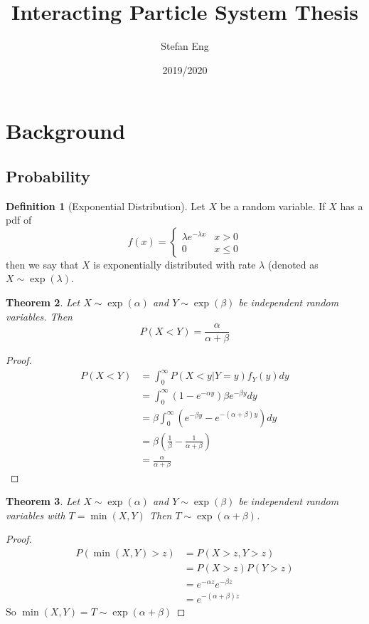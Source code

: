 \documentclass{article}
\title{Interacting Particle System Thesis}
\author{Stefan Eng}
\date{2019/2020}
\theoremstyle{plain}
\newtheorem{theorem}{Theorem}[section]
\theoremstyle{definition}
\newtheorem{defn}[theorem]{Definition}
\theoremstyle{remark}
\begin{document}
\maketitle

\section{Background}

\subsection{Probability}

\begin{defn}[Exponential Distribution]
Let $X$ be a random variable.
If $X$ has a pdf of 
$$
f(x) = \begin{cases}
    \lambda e^{-\lambda x} & x > 0\\
    0 & x \leq 0
    \end{cases}
$$
then we say that $X$ is exponentially distributed with rate $\lambda$ (denoted as $X \sim \exp(\lambda)$.
\end{defn}

\begin{theorem}\label{thm:exp_x_less_y}
Let $X \sim \exp(\alpha)$ and $Y \sim \exp(\beta)$ be independent random variables.
Then 
$$
P(X < Y) = \frac{\alpha}{\alpha + \beta}
$$
\end{theorem}

\begin{proof}
\begin{align*}
    P(X < Y) &= \int_0^\infty P(X < y | Y = y) f_Y(y) dy\\
    &= \int_0^\infty (1 - e^{-\alpha y}) \beta e^{-\beta y} dy\\
    &= \beta \int_0^\infty \left( e^{-\beta y} - e^{-(\alpha + \beta) y}\right) dy\\
    &= \beta \left(\frac{1}{\beta} - \frac{1}{\alpha + \beta}\right)\\
    &= \frac{\alpha}{\alpha + \beta}
\end{align*}
\end{proof}

\begin{theorem}\label{thm:exp_t_cond}
Let $X \sim \exp(\alpha)$ and $Y \sim \exp(\beta)$ be independent random variables with $T = \min(X,Y)$
Then $T \sim \exp(\alpha + \beta)$.
\end{theorem}

\begin{proof}
\begin{align*}
    P(\min(X,Y) > z) &= P(X > z, Y > z)\\
    &= P(X > z) P(Y > z)\\
    &= e^{-\alpha z} e^{-\beta z}\\
    &= e^{-(\alpha + \beta) z}
\end{align*}
So $\min(X,Y) = T \sim \exp(\alpha + \beta)$
\end{proof}
\end{document}
